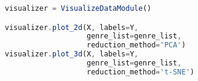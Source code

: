 \begin{lstlisting}[language=TypeScript, label=lst:testing:results]
visualizer = VisualizeDataModule()

visualizer.plot_2d(X, labels=Y, 
                   genre_list=genre_list, 
                   reduction_method='PCA')
visualizer.plot_3d(X, labels=Y, 
                   genre_list=genre_list, 
                   reduction_method='t-SNE')

\end{lstlisting}